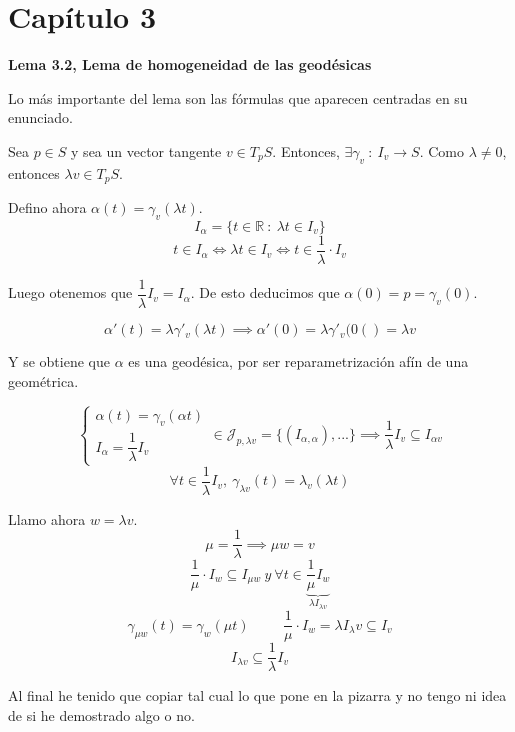 \documentclass[openany]{book}
\begin{document}
\chapter{Capítulo 3}

\begin{center}
\textbf{Lema 3.2, Lema de homogeneidad de las geodésicas}
\end{center}
  Lo más importante del lema son las fórmulas que aparecen centradas en su enunciado.
\begin{demonstration}
  Sea $p \in S$ y sea un vector tangente $v \in T_pS$. Entonces, $\exists \gamma _v \ : \ I_v \to S$. Como $\lambda \ne 0$, entonces $ \lambda v \in T_pS $.

  Defino ahora $ \alpha (t) = \gamma _v (\lambda t) $.
  $$ I_ \alpha = \{ t \in \mathbb{R} \ : \ \lambda t \in I_v  \} $$
  $$ t \in I_ \alpha \iff \lambda t \in I_v  \iff t \in \dfrac{1}{\lambda } \cdot I_v $$

  Luego otenemos que $\dfrac{1}{\lambda} I_v = I_ \alpha $. De esto deducimos que $\alpha (0) = p = \gamma _v(0)$.

  $$ \alpha '(t) = \lambda \gamma '_v( \lambda t) \implies \alpha '(0) = \lambda \gamma' _v (0() = \lambda v$$

  Y se obtiene que $\alpha$ es una geodésica, por ser reparametrización afín de una geométrica.

  $$ \left\{ \begin{array}{l}
    \alpha (t) = \gamma _v (\alpha t)\\
    I_ \alpha  = \dfrac{1}{\lambda} I_v
  \end{array} \right. \in  \mathcal{J}_{p, \lambda v} = \{ (I_{\alpha , \alpha }), ... \} \implies \dfrac{1}{\lambda} I_v \subseteq I_ {\alpha v}$$
  $$\forall t \in \dfrac{1}{\lambda} I_v, \ \gamma _{\lambda v}(t) = \lambda _v( \lambda t)$$

  Llamo ahora $w = \lambda v$.
  $$ \mu = \dfrac{1}{\lambda} \implies \mu w = v $$
  $$ \dfrac{1}{\mu} \cdot I_w \subseteq I_{\mu w}\ y\ \forall t \in \underbrace{ \dfrac{1}{\mu} I_w }_{ \lambda I_{\lambda v} } $$
  $$ \gamma _{\mu w}(t) = \gamma _w(\mu t) \hspace{1cm} \dfrac{1}{\mu} \cdot I_w = \lambda I_ \lambda v \subseteq I_v$$
  $$ I_{\lambda v} \subseteq \dfrac{1}{\lambda} I_v $$

  Al final he tenido que copiar tal cual lo que pone en la pizarra y no tengo ni idea de si he demostrado algo o no.
\end{demonstration}
\end{document}
